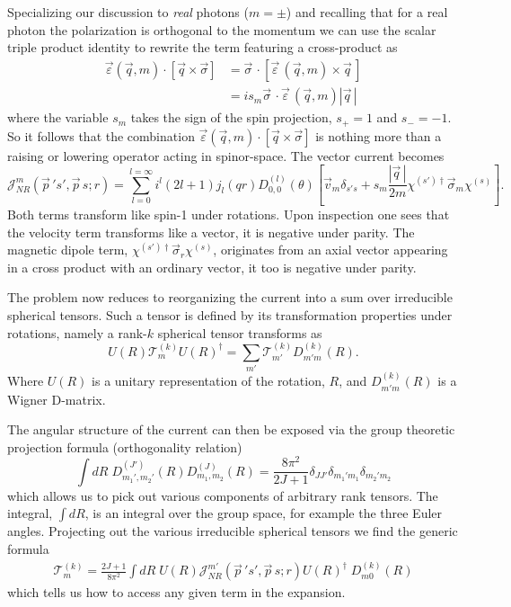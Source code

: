 Specializing our discussion to \emph{real} photons ($m =\pm$) and recalling that for a real photon the polarization is orthogonal to the momentum we can use the scalar triple product identity to rewrite the term featuring a cross-product as 
\begin{align*}
\vec{\varepsilon}(\vec{q},m) \cdot \left[ \vec{q} \times \vec{\sigma} \right] &= \vec{\sigma} \,\cdot \left[ \vec{\varepsilon}\,(\vec{q},m) \times \vec{q} \,\right]  \\
&=  is_m \vec{\sigma} \,\cdot  \vec{\varepsilon}\,(\vec{q},m) |\vec{q}\,| 
\end{align*}
where the variable $s_m$ takes the sign of the spin projection,  $s_+ = 1$ and $s_- = -1$.  So it follows that the combination $\vec{\varepsilon}(\vec{q},m) \cdot \left[ \vec{q} \times \vec{\sigma} \right] $ is nothing more than a raising or lowering operator acting in spinor-space. The vector current becomes 
\begin{equation}
\mathcal{J}^m_{NR}(\vec{p}\,'s',\vec{p}\,s;r) = \sum_{l=0}^{l = \infty} i^l (2l+1) j_l(qr) D^{(l)}_{0,0}(\theta) \left[  \vec{v}_m \delta_{s's}+ s_m\frac{|\vec{q}\,|}{2m} \chi^{(s')\dagger} \vec{\sigma}_{m}  \chi^{(s)} \right]. \label{QM::vec_curren_partial_decomp}
\end{equation}
Both terms transform like spin-1 under rotations. Upon inspection one sees that the velocity term transforms like a vector, it is negative under parity.  The magnetic dipole term, $\chi^{(s')\dagger} \vec{\sigma}_r  \chi^{(s)}$, originates from an axial vector appearing in a cross product with an ordinary vector, it too is negative under parity. 

The problem now reduces to reorganizing the current into a sum over irreducible spherical tensors. Such a tensor is defined by its transformation properties under rotations, namely a rank-$k$ spherical tensor transforms as 
\begin{equation*}
U(R)\mathcal{T}^{(k)}_m U(R)^\dagger = \sum_{m'} \mathcal{T}^{(k)}_{m'}D^{(k)}_{m'm}(R).
\end{equation*}
Where $U(R)$ is a unitary representation of the rotation, $R$, and $D^{(k)}_{m'm}(R)$ is a Wigner D-matrix. 

The angular structure of the current can then be exposed via the group theoretic projection formula (orthogonality relation)
\begin{equation*}
\int dR \; D^{(J')}_{m_1' ,m_2'}(R) D^{(J)}_{m_1 ,m_2}(R) = \frac{8\pi^2}{2J+1} \delta_{JJ'}\delta_{m_1' m_1} \delta_{m_2' m_2}
\end{equation*}
which allows us to pick out various components of arbitrary rank tensors. The integral, $\int dR$, is an integral over the group space, for example the three Euler angles. Projecting out the various irreducible spherical tensors we find the generic formula
\begin{align*}
\mathcal{T}^{(k)}_m = \frac{2J+1}{8\pi^2} \int dR \; U(R) \mathcal{J}^{m'}_{NR}(\vec{p}\,'s',\vec{p}\,s;r) U(R)^\dagger \; D^{(k)}_{m0}(R)
\end{align*}
which tells us how to access any given term in the expansion. 

